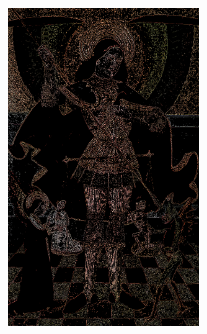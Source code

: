 \begin{figure}[!h]
{        \includegraphics[angle=0,width=0.45\textwidth]{afsnit/afprovning/billeder/thressholds/krafitige_farver/krafite_detalier/1_iteration/300-300.png}
        \label{300-300}}\hspace{1em}
    \\
     \label{allesammen1}
\end{figure}


